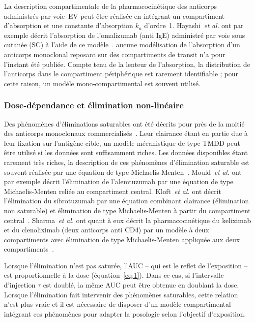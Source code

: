 La description compartimentale de la pharmacocinétique des anticorps administrés par voie~EV peut être réalisée en intégrant un compartiment d'absorption et une constante d'absorption $k_{a}$ d'ordre~1. Hayashi~\textit{et al.} ont par exemple décrit l'absorption de l'omalizumab (anti IgE) administré par voie sous cutanée (SC) à l'aide de ce modèle~\citep{REF61}. aucune modélisation de l'absorption d'un anticorps monoclonal reposant sur des compartiments de transit n'a pour l'instant été publiée. Compte tenu de la lenteur de l'absorption, la distribution de l'anticorps dans le compartiment périphérique est rarement identifiable ; pour cette raison, un modèle mono-compartimental est souvent utilisé.

\subsubsection{Dose-dépendance et élimination non-linéaire}
Des phénomènes d'éliminations saturables ont été décrits pour près de la moitié des anticorps monoclonaux commercialisés~\citep{REF62}. Leur clairance étant en partie due à leur fixation sur l'antigène-cible, un modèle mécanistique de type TMDD peut être utilisé si les données sont suffisamment riches. Les données disponibles étant rarement très riches, la description de ces phénomènes d'élimination saturable est souvent réalisée par une équation de type Michaelis-Menten~\citep{REF3}. Mould~\textit{et al.} ont par exemple décrit l'élimination de l'alemtuzumab par une équation de type Michaelis-Menten reliée au compartiment central. Kloft~\textit{et al.} ont décrit l'élimination du sibrotuzumab par une équation combinant clairance (élimination non saturable) et élimination de type Michaelis-Menten à partir du compartiment central~\citep{REF63}. Sharma~\textit{et al.} ont quant à eux décrit la pharmacocinétique du keliximab et du clenoliximab (deux anticorps anti CD4)  par un modèle à deux compartiments avec élimination de type Michaelis-Menten appliquée aux deux compartiments~\citep{REF64}.

Lorsque l'élimination n'est pas saturée, l'\gls{AUC} -- qui est le reflet de l'exposition -- est proportionnelle à la dose (équation~\ref{eq:1}). Dans ce cas, si l'intervalle d'injection $\tau$ est doublé, la même \gls{AUC} peut être obtenue en doublant la dose. Lorsque l'élimination fait intervenir des phénomènes saturables, cette relation n'est plus vraie et il est nécessaire de disposer d'un modèle compartimental intégrant ces phénomènes pour adapter la posologie selon l'objectif d'exposition.

